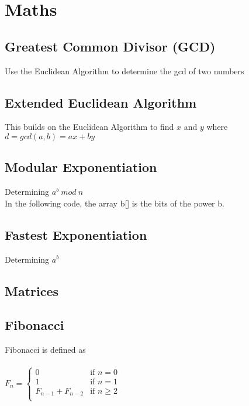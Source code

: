 \section{Maths}

\subsection{Greatest Common Divisor (GCD)}
Use the Euclidean Algorithm to determine the gcd of two numbers




\subsection{Extended Euclidean Algorithm}
This builds on the Euclidean Algorithm to find $x$ and $y$ where $d = gcd(a, b) = ax + by$



\subsection{Modular Exponentiation}
Determining $a^b \ mod \ n$ \\
In the following code, the array b[] is the bits of the power b.



\subsection{Fastest Exponentiation}
Determining $a^b$



\subsection{Matrices}



\subsection{Fibonacci}
Fibonacci is defined as \\ \\
$
F_n =
\left\{
\begin{array}{ll}
0                      & \mbox{if } n =    0 \\
1                      & \mbox{if } n =    1 \\
F_{n - 1} + F_{n - 2}  & \mbox{if } n \geq 2 \\
\end{array}
\right.
$ \\ \\

